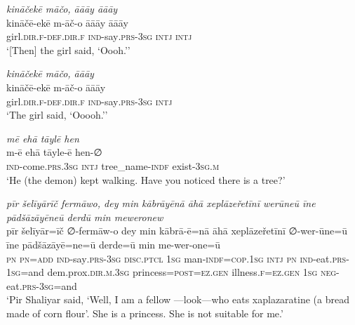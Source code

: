 \ea \label{ŽP.181}
\textit{kināčekē māčo, āāāy āāāy} \\ 
\gll kināčē-ekē m-āč-o āāāy āāāy \\ 
 girl\textsc{.dir}\textsc{.f}\textsc{-def}\textsc{.dir}\textsc{.f} \textsc{ind-}say\textsc{.prs}\textsc{-3sg} \textsc{intj} \textsc{intj} \\ 
\glt `[Then] the girl said, ‘Oooh.’'
\z 
 
\ea \label{ŽP.183}
\textit{kināčekē māčo, āāāy} \\ 
\gll kināčē-ekē m-āč-o āāāy \\ 
 girl\textsc{.dir}\textsc{.f}\textsc{-def}\textsc{.dir}\textsc{.f} \textsc{ind-}say\textsc{.prs}\textsc{-3sg} \textsc{intj} \\ 
\glt `The girl said, ‘Ooooh.’'
\z 
 
\ea \label{ŽP.195}
\textit{mē ehā tāylē hen} \\ 
\gll m-ē ehā tāyle-ē hen-∅ \\ 
 \textsc{ind-}come\textsc{.prs}\textsc{.3sg} \textsc{intj} tree\_name\textsc{-indf} exist\textsc{-3sg}\textsc{.m} \\ 
\glt `He (the demon) kept walking. Have you noticed there is a tree?'
\z 
 
\ea \label{ŽP.210}
\textit{pīr šelīyārīč fermāwo, dey min kābrāyēnā āhā xeplāzeřetīnī werūneū īne pādšāzāyēneū derdū min meweronew} \\ 
\gll pīr šelīyār=īč ∅-fermāw-o dey min kābrā-ē=nā āhā xeplāzeřetīnī ∅-wer-ūne=ū īne pādšāzāyē=ne=ū derde=ū min me-wer-one=ū \\ 
 \textsc{pn} \textsc{pn}\textsc{=add} \textsc{ind-}say\textsc{.prs}\textsc{-3sg} \textsc{disc.ptcl} \textsc{1sg} man\textsc{-indf}\textsc{=cop}\textsc{.\textsc{1sg}} \textsc{intj} \textsc{pn} \textsc{ind-}eat\textsc{.prs}\textsc{-\textsc{1sg}}=and dem.prox\textsc{.dir}\textsc{.m}\textsc{.3sg} princess\textsc{=\textsc{post}}\textsc{\textsc{=ez.gen}} illness\textsc{.f}\textsc{\textsc{=ez.gen}} \textsc{1sg} \textsc{neg-}eat\textsc{.prs}\textsc{-3sg}=and \\ 
\glt `Pir Shaliyar said, ‘Well, I am a fellow —look—who eats xaplazaratine (a bread made of corn flour’. She is a princess. She is not suitable for me.'
\z 
 
